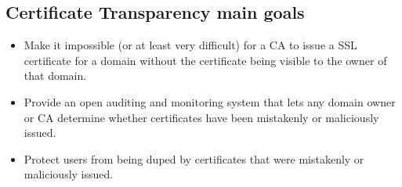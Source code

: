 \documentclass[fs, footer]{latex4ei}
\begin{document}
\begin{multicols*}{4}
{\subsection{Certificate Transparency  main goals}
\begin{itemize}
	\item Make it impossible (or at least very difficult) for a CA to issue a SSL certificate for a domain without the certificate being visible to the owner of that domain.
	\item Provide an open auditing and monitoring system that lets any domain owner or CA determine whether certificates have been mistakenly or maliciously issued.
	\item Protect users from being duped by certificates that were mistakenly or maliciously issued.
\end{itemize}
}
\end{multicols*}

\end{document}
